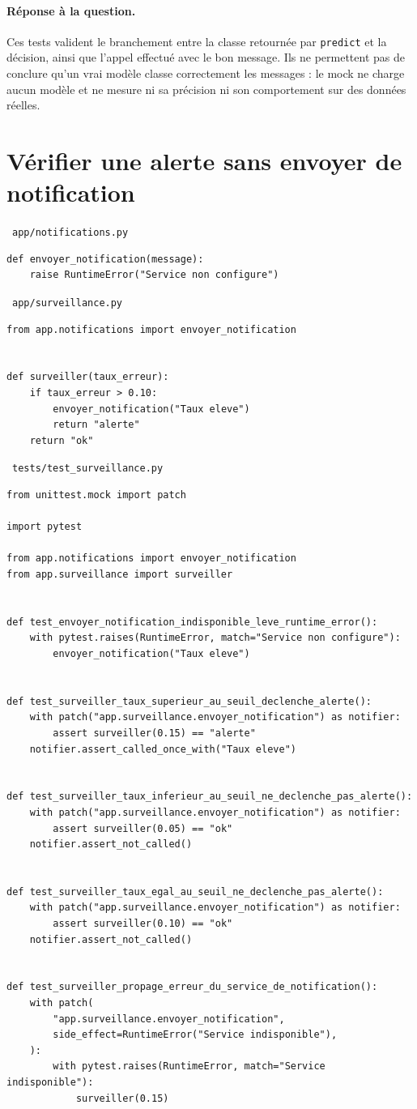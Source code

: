 \documentclass[11pt,a4paper]{article}
\newcommand{\fichier}[1]{%
  \par\medskip\noindent
  {\sffamily\small\bfseries\color{ENIADNavy}%
   \colorbox{ENIADLightBlue}{\strut\ \texttt{#1}\ }}%
  \par\nopagebreak\vspace{-2pt}}
\begin{document}
\paragraph{Réponse à la question.}
Ces tests valident le branchement entre la classe retournée par \texttt{predict}
et la décision, ainsi que l'appel effectué avec le bon message. Ils ne
permettent pas de conclure qu'un vrai modèle classe correctement les messages :
le mock ne charge aucun modèle et ne mesure ni sa précision ni son comportement
sur des données réelles.

\section{Vérifier une alerte sans envoyer de notification}

\fichier{app/notifications.py}
\begin{lstlisting}
def envoyer_notification(message):
    raise RuntimeError("Service non configure")
\end{lstlisting}

\fichier{app/surveillance.py}
\begin{lstlisting}
from app.notifications import envoyer_notification


def surveiller(taux_erreur):
    if taux_erreur > 0.10:
        envoyer_notification("Taux eleve")
        return "alerte"
    return "ok"
\end{lstlisting}

\fichier{tests/test\_surveillance.py}
\begin{lstlisting}
from unittest.mock import patch

import pytest

from app.notifications import envoyer_notification
from app.surveillance import surveiller


def test_envoyer_notification_indisponible_leve_runtime_error():
    with pytest.raises(RuntimeError, match="Service non configure"):
        envoyer_notification("Taux eleve")


def test_surveiller_taux_superieur_au_seuil_declenche_alerte():
    with patch("app.surveillance.envoyer_notification") as notifier:
        assert surveiller(0.15) == "alerte"
    notifier.assert_called_once_with("Taux eleve")


def test_surveiller_taux_inferieur_au_seuil_ne_declenche_pas_alerte():
    with patch("app.surveillance.envoyer_notification") as notifier:
        assert surveiller(0.05) == "ok"
    notifier.assert_not_called()


def test_surveiller_taux_egal_au_seuil_ne_declenche_pas_alerte():
    with patch("app.surveillance.envoyer_notification") as notifier:
        assert surveiller(0.10) == "ok"
    notifier.assert_not_called()


def test_surveiller_propage_erreur_du_service_de_notification():
    with patch(
        "app.surveillance.envoyer_notification",
        side_effect=RuntimeError("Service indisponible"),
    ):
        with pytest.raises(RuntimeError, match="Service indisponible"):
            surveiller(0.15)
\end{lstlisting}
\end{document}
